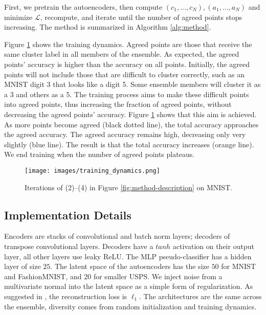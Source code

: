 \documentclass[runningheads]{llncs}
\begin{document}
\noindent First, we pretrain the autoencoders, then compute $(c_1, \dots, c_N), (a_1, \dots, a_N)$ and minimize $\mathcal{L}$, recompute, and iterate until the number of agreed points stops increasing. The method is summarized in Algorithm \ref{alg:method}.

Figure \ref{fig:training-dynamics} shows the training dynamics. Agreed points are those that receive the same cluster label in all members of the ensemble. As expected, the agreed points' accuracy is higher than the accuracy on all points. Initially, the agreed points will not include those that are difficult to cluster correctly, such as an MNIST digit 3 that looks like a digit 5. Some ensemble members will cluster it as a 3 and others as a 5. The training process aims to make these difficult points into agreed points, thus increasing the fraction of agreed points, without decreasing the agreed points' accuracy. Figure \ref{fig:training-dynamics} shows that this aim is achieved. As more points become agreed (black dotted line), the total accuracy approaches the agreed accuracy. The agreed accuracy remains high, decreasing only very slightly (blue line). The result is that the total accuracy increases (orange line). We end training when the number of agreed points plateaus. 

\begin{figure}[t]
\centering
\texttt{[image: images/training\_dynamics.png]}\vspace*{-1ex}
    \caption{ \footnotesize Iterations of (2)--(4) in Figure \ref{fig:method-description} on MNIST.}
    \label{fig:training-dynamics}\vspace*{-2ex}
\end{figure}

\subsection{Implementation Details}
Encoders are stacks of convolutional and batch norm layers; decoders of transpose convolutional layers. Decoders have a $tanh$ activation on their output layer, all other layers use leaky ReLU. The MLP pseudo-classifier has a hidden layer of size $25$. The latent space of the autoencoders has the size $50$ for MNIST and FashionMNIST, and $20$ for smaller USPS. We inject noise from a multivariate normal into the latent space as a simple form of regularization. As suggested in \cite{zhao2015loss}, the reconstruction loss is $\ell_1$. The architectures are the same across the ensemble, diversity comes from random initialization and training dynamics.
\end{document}
